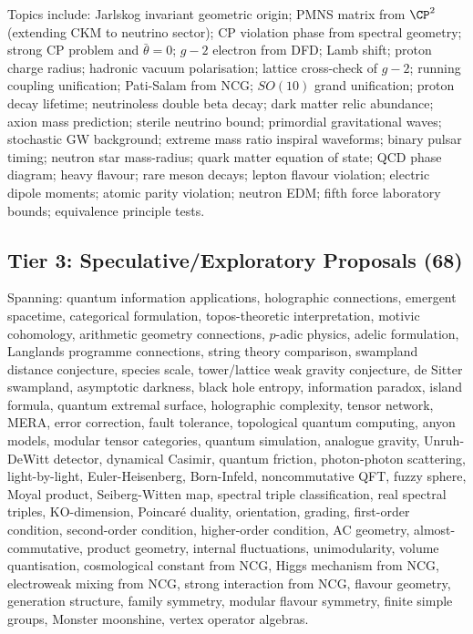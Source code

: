 \documentclass[11pt,a4paper]{article}
\begin{document}
Topics include: Jarlskog invariant geometric origin; PMNS matrix from $\CP^2$ (extending CKM to neutrino sector); CP violation phase from spectral geometry; strong CP problem and $\bar{\theta} = 0$; $g-2$ electron from DFD; Lamb shift; proton charge radius; hadronic vacuum polarisation; lattice cross-check of $g-2$; running coupling unification; Pati-Salam from NCG; $SO(10)$ grand unification; proton decay lifetime; neutrinoless double beta decay; dark matter relic abundance; axion mass prediction; sterile neutrino bound; primordial gravitational waves; stochastic GW background; extreme mass ratio inspiral waveforms; binary pulsar timing; neutron star mass-radius; quark matter equation of state; QCD phase diagram; heavy flavour; rare meson decays; lepton flavour violation; electric dipole moments; atomic parity violation; neutron EDM; fifth force laboratory bounds; equivalence principle tests.

\subsection{Tier 3: Speculative/Exploratory Proposals (68)}

Spanning: quantum information applications, holographic connections, emergent spacetime, categorical formulation, topos-theoretic interpretation, motivic cohomology, arithmetic geometry connections, $p$-adic physics, adelic formulation, Langlands programme connections, string theory comparison, swampland distance conjecture, species scale, tower/lattice weak gravity conjecture, de Sitter swampland, asymptotic darkness, black hole entropy, information paradox, island formula, quantum extremal surface, holographic complexity, tensor network, MERA, error correction, fault tolerance, topological quantum computing, anyon models, modular tensor categories, quantum simulation, analogue gravity, Unruh-DeWitt detector, dynamical Casimir, quantum friction, photon-photon scattering, light-by-light, Euler-Heisenberg, Born-Infeld, noncommutative QFT, fuzzy sphere, Moyal product, Seiberg-Witten map, spectral triple classification, real spectral triples, KO-dimension, Poincar\'{e} duality, orientation, grading, first-order condition, second-order condition, higher-order condition, AC geometry, almost-commutative, product geometry, internal fluctuations, unimodularity, volume quantisation, cosmological constant from NCG, Higgs mechanism from NCG, electroweak mixing from NCG, strong interaction from NCG, flavour geometry, generation structure, family symmetry, modular flavour symmetry, finite simple groups, Monster moonshine, vertex operator algebras.
\end{document}
